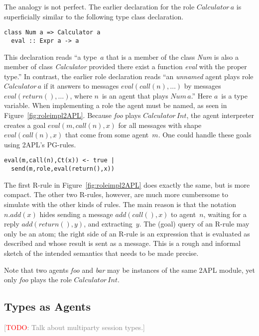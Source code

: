\documentclass[conference,compsoc]{IEEEtran} %
\newcommand{\todo}[1]{{\small \textcolor{gray}{[\textcolor{red}{TODO}: #1]}}}
\begin{document}
The analogy is not perfect. The earlier declaration for the role
$\mathit{Calculator}\,a$ is superficially similar to the following type
class declaration.
\begin{lstlisting}[style=hs]
class Num a => Calculator a
  eval :: Expr a -> a
\end{lstlisting}
This declaration reads ``a type~$a$ that is a member of the class
\textit{Num} is also a member of class \textit{Calculator} provided there
exist a function \textit{eval} with the proper type.'' In contrast, the
earlier role declaration reads ``an \emph{unnamed} agent plays role
$\mathit{Calculator}\,a$ if it answers to messages
$\mathit{eval}(\mathit{call}(n),\ldots)$ by messages
$\mathit{eval}(\mathit{return}(),\ldots)$, where $n$~is an agent that plays
$\mathit{Num}\,a$.'' Here $a$~is a type variable.  When implementing a role
the agent must be named, as seen in Figure~\ref{fig:roleimpl2APL}. Because
\textit{foo} plays $\mathit{Calculator}\,\mathit{Int}$, the agent
interpreter creates a goal $\mathit{eval}(m,\mathit{call}(n),x)$ for all
messages with shape $\mathit{eval}(\mathit{call}(n),x)$ that come from some
agent~$m$.  One could handle these goals using 2APL's PG-rules.
\begin{lstlisting}[style=me]
eval(m,call(n),Ct(x)) <- true |
  send(m,role,eval(return(),x))
\end{lstlisting}
The first R-rule in Figure~\ref{fig:roleimpl2APL} does exactly the same,
but is more compact. The other two R-rules, however, are much more
cumbersome to simulate with the other kinds of rules. The main reason is
that the notation $n.\mathit{add}(x)$ hides sending a message
$\mathit{add}(\mathit{call}(),x)$ to agent~$n$, waiting for a reply
$\mathit{add}(\mathit{return}(),y)$, and extracting~$y$. The (goal) query
of an R-rule may only be an atom; the right side of an R-rule is an
expression that is evaluated as described and whose result is sent as a
message.  This is a rough and informal sketch of the intended semantics
that needs to be made precise.

Note that two agents \textit{foo} and \textit{bar} may be instances of the
same 2APL module, yet only \textit{foo} plays the role
$\mathit{Calculator}\,\mathit{Int}$.

\subsection{Types as Agents} %

\todo{Talk about multiparty session types.}
\end{document}
